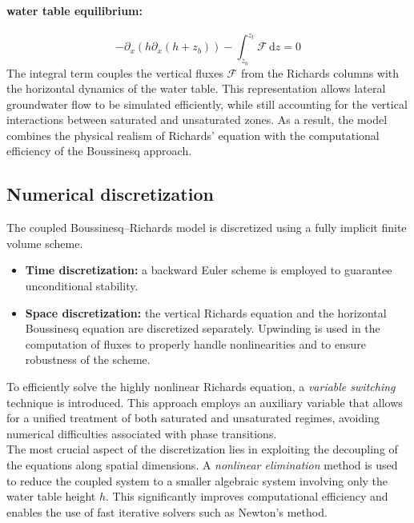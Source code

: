 \documentclass[12pt,a4paper]{article}
\begin{document}
\paragraph{water table equilibrium:}  
\begin{equation}\label{mod_dupuit}
-\partial_x\left( h \partial_x \left( h + z_b \right) \right) - \int_{z_b}^{z_t} \mathcal{F}\, \mathrm{d}z = 0
\end{equation}
The integral term couples the vertical fluxes $\mathcal{F}$ from the Richards columns with the horizontal dynamics of the water table.  
This representation allows lateral groundwater flow to be simulated efficiently, while still accounting for the vertical interactions between saturated and unsaturated zones.  
As a result, the model combines the physical realism of Richards’ equation with the computational efficiency of the Boussinesq approach.



\subsection{Numerical discretization}

The coupled Boussinesq--Richards model is discretized using a fully implicit finite volume scheme.  
\begin{itemize}
    \item \textbf{Time discretization:} a backward Euler scheme is employed to guarantee unconditional stability.  
    \item \textbf{Space discretization:} the vertical Richards equation and the horizontal Boussinesq equation are discretized separately. Upwinding is used in the computation of fluxes to properly handle nonlinearities and to ensure robustness of the scheme.  
\end{itemize}

To efficiently solve the highly nonlinear Richards equation, a \emph{variable switching} technique is introduced. This approach employs an auxiliary variable that allows for a unified treatment of both saturated and unsaturated regimes, avoiding numerical difficulties associated with phase transitions. \\ 

The most crucial aspect of the discretization lies in exploiting the decoupling of the equations along spatial dimensions. A \emph{nonlinear elimination} method is used to reduce the coupled system to a smaller algebraic system involving only the water table height \(h\). This significantly improves computational efficiency and enables the use of fast iterative solvers such as Newton's method.
\end{document}
